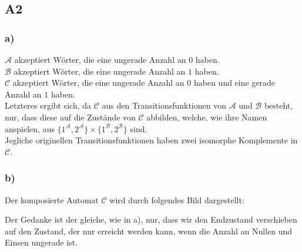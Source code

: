 \documentclass[12pt, a4paper]{article}
\begin{document}
\begin{doublespace}
\subsection*{A2}
\subsubsection*{a)}
\(\mathcal{A}\) akzeptiert Wörter, die eine ungerade Anzahl an \(0\) haben. \\
\(\mathcal{B}\) akzeptiert Wörter, die eine ungerade Anzahl an \(1\) haben. \\
\(\mathcal{C}\) akzeptiert Wörter, die eine ungerade Anzahl an \(0\) haben und eine gerade Anzahl an \(1\) haben.\\
Letzteres ergibt sich, da \(\mathcal{C}\) aus den Transitionsfunktionen von \(\mathcal{A}\) und \(\mathcal{B}\) besteht, nur, dass diese auf die Zustände von \(\mathcal{C}\) abbilden, welche, wie ihre Namen anspielen, aus \(\{1^\mathcal A, 2^\mathcal A\} \times \{1^\mathcal B, 2^\mathcal B\}\) sind. \\
Jegliche originellen Transitionsfunktionen haben zwei isomorphe Komplemente in \(\mathcal{C}\).
\subsubsection*{b)}
Der komposierte Automat \(\mathcal{C}\) wird durch folgendes Bild dargestellt:
\begin{center}
\end{center}
Der Gedanke ist der gleiche, wie in a), nur, dass wir den Endzustand verschieben auf den Zustand, der nur erreicht werden kann, wenn die Anzahl an Nullen und Einsen ungerade ist.

\end{doublespace}
\end{document}
